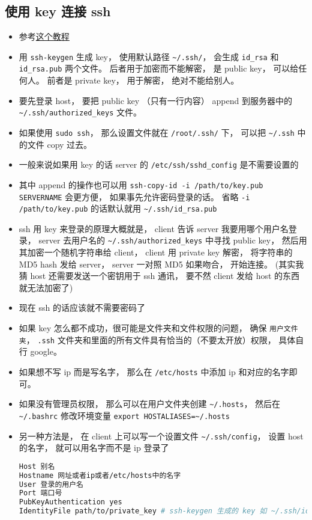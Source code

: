 \subsection{使用 key 连接 ssh}
\begin{itemize}
\item 参考\href{https://www.digitalocean.com/community/tutorials/ssh-essentials-working-with-ssh-servers-clients-and-keys}{这个教程}
\item 用 \verb`ssh-keygen` 生成 key， 使用默认路径 \verb`~/.ssh/`， 会生成 \verb`id_rsa` 和 \verb`id_rsa.pub` 两个文件。 后者用于加密而不能解密， 是 public key， 可以给任何人。 前者是 private key， 用于解密， 绝对不能给别人。
\item 要先登录 host， 要把 public key （只有一行内容） append 到服务器中的 \verb`~/.ssh/authorized_keys` 文件。
\item 如果使用 \verb|sudo ssh|， 那么设置文件就在 \verb|/root/.ssh/| 下， 可以把 \verb|~/.ssh| 中的文件 copy 过去。
\item 一般来说如果用 key 的话 server 的 \verb`/etc/ssh/sshd_config` 是不需要设置的
\item 其中 append 的操作也可以用 \verb`ssh-copy-id -i /path/to/key.pub SERVERNAME` 会更方便， 如果事先允许密码登录的话。 省略 \verb|-i /path/to/key.pub| 的话默认就用 \verb|~/.ssh/id_rsa.pub|
\item ssh 用 key 来登录的原理大概就是， client 告诉 server 我要用哪个用户名登录， server 去用户名的 \verb`~/.ssh/authorized_keys` 中寻找 public key， 然后用其加密一个随机字符串给 client， client 用 private key 解密， 将字符串的 MD5 hash 发给 server， server 一对照 MD5 如果吻合， 开始连接。  (其实我猜 host 还需要发送一个密钥用于 ssh 通讯， 要不然 client 发给 host 的东西就无法加密了)
\item 现在 ssh 的话应该就不需要密码了
\item 如果 key 怎么都不成功，很可能是文件夹和文件权限的问题， 确保 \verb|用户文件夹|， \verb|.ssh| 文件夹和里面的所有文件具有恰当的（不要太开放）权限， 具体自行 google。
\item 如果想不写 ip 而是写名字， 那么在 \verb|/etc/hosts| 中添加 ip 和对应的名字即可。
\item 如果没有管理员权限， 那么可以在用户文件夹创建 \verb|~/.hosts|， 然后在 \verb|~/.bashrc| 修改环境变量 \verb|export HOSTALIASES=~/.hosts|
\item 另一种方法是， 在 client 上可以写一个设置文件 \verb`~/.ssh/config`， 设置 host 的名字， 就可以用名字而不是 ip 登录了
\begin{lstlisting}[language=bash]
Host 别名
Hostname 网址或者ip或者/etc/hosts中的名字
User 登录的用户名
Port 端口号
PubKeyAuthentication yes
IdentityFile path/to/private_key # ssh-keygen 生成的 key 如 ~/.ssh/id_rsa


\end{lstlisting}
\end{itemize}
